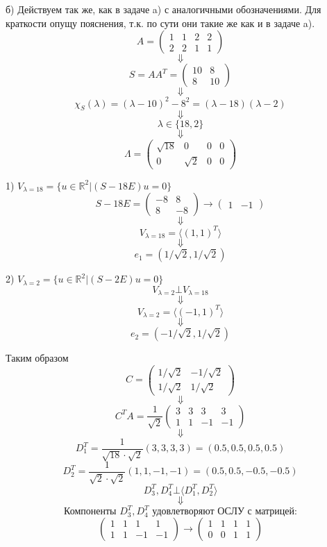 \documentclass{article}
\begin{document}
\par
б) Действуем так же, как в задаче a) с аналогичными обозначениями. Для краткости опущу пояснения, т.к. по сути они такие же как и в задаче a).
$$A=\left(\begin{array}{rrrr}1 & 1 & 2 & 2\\2 & 2 & 1 & 1\end{array}\right)$$
$$\Downarrow$$
$$S=AA^T=\left(\begin{array}{rr}10 & 8\\8 & 10\end{array}\right)$$
$$\Downarrow$$
$$\chi_S(\lambda)=(\lambda-10)^2-8^2=(\lambda-18)(\lambda-2)$$
$$\Downarrow$$
$$\lambda\in\{18,2\}$$
$$\Downarrow$$
$$\Lambda=\left(\begin{array}{rrrr}\sqrt{18} & 0 & 0 & 0\\0 & \sqrt{2} & 0 & 0\end{array}\right)$$
\par
1) $V_{\lambda=18}=\{u\in\mathbb{R}^2|(S-18E)u=0\}$
$$S-18E=\left(\begin{array}{rr}-8 & 8\\8 & -8\end{array}\right)\rightarrow\left(\begin{array}{rr}1 & -1\end{array}\right)$$
$$\Downarrow$$
$$V_{\lambda=18}=\langle (1,1)^T \rangle$$
$$\Downarrow$$
$$e_1=(1/\sqrt{2}, 1/\sqrt{2})$$
\par
2)  $V_{\lambda=2}=\{u\in\mathbb{R}^2|(S-2E)u=0\}$
$$V_{\lambda=2}\bot V_{\lambda=18}$$
$$\Downarrow$$
$$V_{\lambda=2}=\langle (-1,1)^T \rangle$$
$$\Downarrow$$
$$e_2=(-1/\sqrt{2}, 1/\sqrt{2})$$
\par
Таким образом
$$C=\left(\begin{array}{rr}1/\sqrt{2} & -1/\sqrt{2}\\1/\sqrt{2} & 1/\sqrt{2}\end{array}\right)$$
$$\Downarrow$$
$$C^TA=\frac{1}{\sqrt{2}}\left(\begin{array}{rrrr}3 & 3 & 3 & 3\\1 & 1 & -1 & -1\end{array}\right)$$
$$\Downarrow$$
$$D_1^T=\frac{1}{\sqrt{18}\cdot\sqrt{2}}(3,3,3,3)=(0.5,0.5,0.5,0.5)$$
$$D_2^T=\frac{1}{\sqrt{2}\cdot\sqrt{2}}(1,1,-1,-1)=(0.5,0.5,-0.5,-0.5)$$
$$D_3^T,D_4^T\bot\langle D_1^T, D_2^T \rangle$$
$$\Downarrow$$
$$\textrm{Компоненты } D_3^T, D_4^T \textrm{ удовлетворяют ОСЛУ с матрицей:}$$
$$\left(\begin{array}{rrrr}1 & 1 & 1 & 1\\1 & 1 & -1 & -1\end{array}\right)\rightarrow\left(\begin{array}{rrrr}1 & 1 & 1 & 1\\0 & 0 & 1 & 1\end{array}\right)$$
\end{document}
